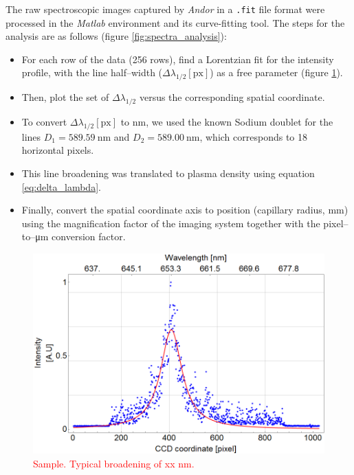 \documentclass[../main.tex]{subfiles}
\begin{document}
The raw spectroscopic images captured by \textit{Andor} in a \texttt{.fit} file format were processed in the \textit{Matlab} environment and its curve-fitting tool. The steps for the analysis are as follows (figure \ref{fig:spectra_analysis}):
\begin{itemize}[label={$-$}]
\item For each row of the data (256 rows), find a Lorentzian fit for the intensity profile, with the line half--width ($\Delta\lambda_{1/2}\left[\text{px}\right]$) as a free parameter (figure \ref{fig:single-lorentzian}).
\item Then, plot the set of $\Delta\lambda_{1/2}$ versus the corresponding spatial coordinate.
\item To convert $\Delta\lambda_{1/2}\left[\text{px}\right]$ to \si{\nm}, we used the known Sodium doublet for the lines $D_1=\SI{589.59}{\nm}$ and $D_2=\SI{589.00}{\nm}$, which corresponds to 18 horizontal pixels.
\item This line broadening was translated to plasma density using equation \ref{eq:delta_lambda}.
\item Finally, convert the spatial coordinate axis to position (capillary radius, \si{\mm}) using the magnification factor of the imaging system together with the pixel--to--\si{\um} conversion factor.
\end{itemize}
\begin{figure}
    \centering
    \includegraphics[width=\textwidth]{figures/spectro/sample-lorentzian.png}
    \caption{\textcolor{red}{Sample. Typical broadening of xx nm.}}
    \label{fig:single-lorentzian}
\end{figure}
\end{document}
